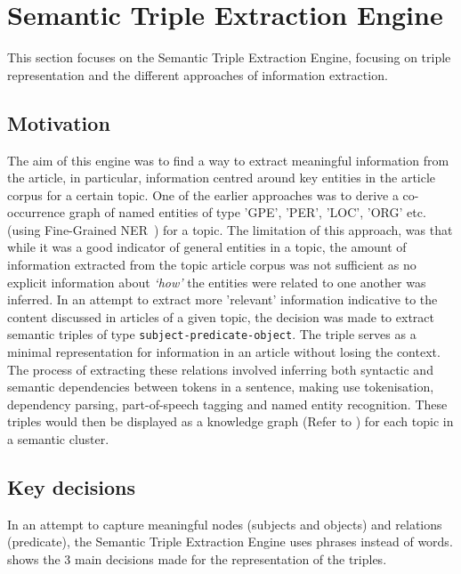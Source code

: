 \chapter{Semantic Triple Extraction Engine}  \label{ch:5:triple}

\vspace{-2ex}
This section focuses on the Semantic Triple Extraction Engine, focusing on triple representation and the different approaches of information extraction.

\section{Motivation}
The aim of this engine was to find a way to extract meaningful information from the article, in particular, information centred around key entities in the article corpus for a certain topic. One of the earlier approaches was to derive a co-occurrence graph of named entities of type 'GPE', 'PER', 'LOC', 'ORG' etc. (using Fine-Grained NER~) for a topic. The limitation of this approach, was that while it was a good indicator of general entities in a topic, the amount of information extracted from the topic article corpus was not sufficient as no explicit information about \textit{`how'} the entities were related to one another was inferred. In an attempt to extract more 'relevant' information indicative to the content discussed in articles of a given topic, the decision was made to extract semantic triples of type \texttt{subject-predicate-object}. The triple serves as a minimal representation for information in an article without losing the context. The process of extracting these relations involved inferring both syntactic and semantic dependencies between tokens in a sentence, making use tokenisation, dependency parsing,  part-of-speech tagging and named entity recognition. These triples would then be displayed as a knowledge graph (Refer to ) for each topic in a semantic cluster.

\section{Key decisions} \label{key_decisions_rel}

In an attempt to capture meaningful nodes (subjects and objects) and relations (predicate), the Semantic Triple Extraction Engine uses phrases instead of words.  shows the 3 main decisions made for the representation of the triples. 

